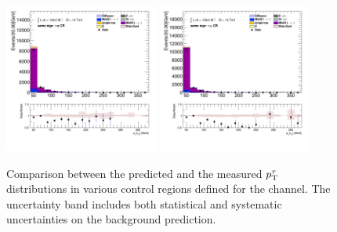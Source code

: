 \begin{figure}[!htp]
\begin{center}
			\includegraphics[width=0.45\textwidth]{chapters/chapter6_HPlus/images/taulep/tau_0_pt_SS_TAUEL.png} 
			\includegraphics[width=0.45\textwidth]{chapters/chapter6_HPlus/images/taulep/tau_0_pt_SS_TAUMU.png} \\
			\end{center}
			\caption{
			Comparison between the predicted and the measured $p_{\text{T}}^{\tau}$ distributions in various control regions defined for the \taulep channel. The uncertainty band includes both statistical and systematic uncertainties on the background prediction. 
			}
			\label{fig:bkg-pt-tau-taulep}
		\end{figure}
		
